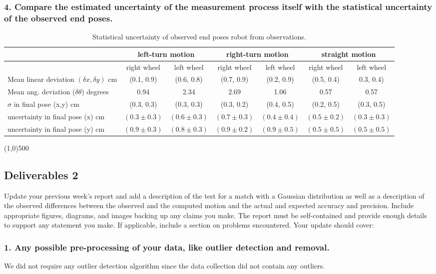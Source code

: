 \documentclass[11pt,a4paper,openright,twoside]{extreport}
\newcommand{\sectionLine}{\begin{center}\line(1,0){500}\end{center}}
\begin{document}
\subsubsection*{4. Compare the estimated uncertainty of the measurement process itself with the statistical uncertainty of the observed end poses.}
\begin{table}[ht]
\centering
\begin{tabular}{| l | c | c | c | c | c | c |}
\hline
 & \multicolumn{2}{c|}{left-turn motion} & \multicolumn{2}{c|}{ right-turn motion} & \multicolumn{2}{c|}{straight motion} \\
\hline
 & right wheel & left wheel & right wheel & left wheel & right wheel & left wheel \\
\hline
Mean linear deviation $(\delta x, \delta y)$ cm & (0.1, 0.9) & (0.6, 0.8)
& (0.7, 0.9) & (0.2, 0.9) & (0.5, 0.4) & 0.3, 0.4) \\
\hline
Mean ang. deviation ($\delta \theta$) degrees & 0.94 & 2.34 & 2.69 & 1.06 & 0.57 & 0.57 \\
\hline
$\sigma$ in final pose (x,y) cm & (0.3, 0.3) & (0.3, 0.3) & (0.3, 0.2) & (0.4, 0.5) & (0.2, 0.5) & (0.3, 0.5)\\
\hline
uncertainty in final pose (x) cm & $(0.3 \pm 0.3)$ & $(0.6 \pm 0.3)$ & $(0.7 \pm 0.3)$ & $(0.4 \pm 0.4)$ & $(0.5 \pm 0.2)$ & $(0.3 \pm 0.3)$ \\
uncertainty in final pose (y) cm & $(0.9 \pm 0.3)$ & $(0.8 \pm 0.3)$ & $(0.9 \pm 0.2)$ & $(0.9 \pm 0.5)$ & $(0.5 \pm 0.5)$ & $(0.5 \pm 0.5)$ \\
\hline
\end{tabular}
\caption{Statistical uncertainty of observed end poses robot from observations.}
\label{stats}
\end{table}
\sectionLine
\subsection*{Deliverables 2}
Update your previous week’s report and add a description of the test for a match with a Gaussian distribution as well as a description of the observed differences between the observed and the computed motion and the actual and expected accuracy and precision. Include appropriate figures, diagrams, and images backing up any claims you make. The report must be self-contained and provide enough details to support any statement you make. If applicable, include a section on problems encountered. Your update should cover:

\subsubsection*{1. Any possible pre-processing of your data, like outlier detection and removal.}
We did not require any outlier detection algorithm since the data collection did not contain any outliers.
\end{document}
